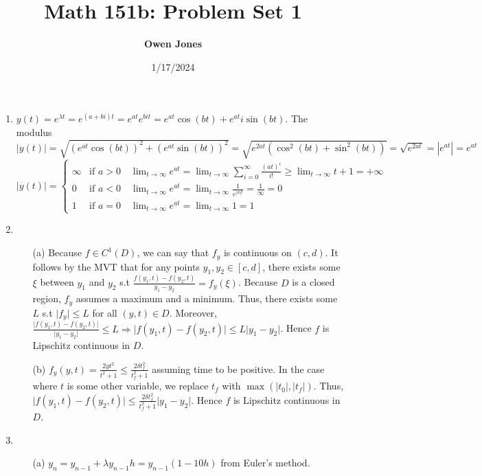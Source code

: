 \documentclass[10pt]{article}
\title{\bf Math 151b: Problem Set 1}
\date{1/17/2024}
\author{\bf Owen Jones}
\begin{document}
\maketitle
\begin{enumerate}[label=\bf{Problem \arabic*}]
    \item $y(t)=e^{\lambda t}=e^{(a+bi)t}=e^{at} e^{bit}=e^{at}\cos(bt)+e^{at}i\sin(bt)$. 
    The modulus $|y(t)|=\sqrt{{(e^{at}\cos(bt))}^2+{(e^{at}\sin(bt))}^2}=\sqrt{e^{2at}(\cos^2(bt)+\sin^2(bt))}=\sqrt{e^{2at}}=|e^{at}|=e^{at}$\\
    $|y(t)|=\begin{cases}
        \infty & \text{if } a>0 \quad \lim_{t\rightarrow \infty}e^{at}=\lim_{t\rightarrow \infty}\sum_{i=0}^{\infty}\frac{{(at)}^i}{i!}\ge\lim_{t\rightarrow \infty}t+1=+\infty\\
        0 & \text{if } a<0 \quad \lim_{t\rightarrow \infty}e^{at}=\lim_{t\rightarrow \infty}\frac{1}{e^{|a|t}}=\frac{1}{\infty}=0\\
        1 & \text{if } a=0 \quad \lim_{t\rightarrow \infty}e^{at}=\lim_{t\rightarrow \infty}1=1
    \end{cases}$
    \item \begin{itemize}
        \item [(a)] Because $f\in C^1(D)$, we can say that $f_y$ is continuous on $(c,d)$. 
        It follows by the MVT that for any points $y_1,y_2\in[c,d]$, there exists some $\xi$ between $y_1$ and $y_2$ s.t $\frac{f(y_1,t)-f(y_2,t)}{y_1-y_2}=f_y(\xi)$. 
        Because $D$ is a closed region, $f_y$ assumes a maximum and a minimum. 
        Thus, there exists some $L$ s.t $\lvert f_y\rvert\le L$ for all $(y,t)\in D$. 
        Moreover, $\frac{\lvert f(y_1,t)-f(y_2,t)\rvert}{\lvert y_1-y_2\rvert}\le L\Rightarrow \lvert f(y_1,t)-f(y_2,t)\rvert\le L\lvert y_1-y_2\rvert$. Hence $f$ is Lipschitz continuous in $D$.
        \item [(b)] $f_y(y,t)=\frac{2yt^2}{t^2+1}\le \frac{2\delta t_f^2}{t_f^2+1}$ assuming time to be positive. 
        In the case where $t$ is some other variable, we replace $t_f$ with $\max(\lvert t_0\rvert,\lvert t_f\rvert)$.
        Thus, $\lvert f(y_1,t)-f(y_2,t)\rvert\le \frac{2\delta t_f^2}{t_f^2+1}\lvert y_1-y_2\rvert$. 
        Hence $f$ is Lipschitz continuous in $D$. 
    \end{itemize}
    \item \begin{itemize}
        \item [(a)] $y_n=y_{n-1}+\lambda y_{n-1}h=y_{n-1}(1-10h)$ from Euler's method. 

\end{itemize}
\end{enumerate}
\end{document}
